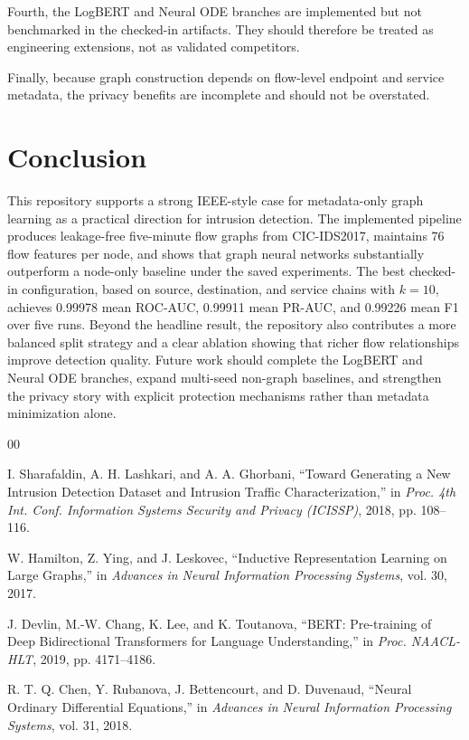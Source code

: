 \documentclass[conference]{IEEEtran}
\begin{document}
Fourth, the LogBERT and Neural ODE branches are implemented but not benchmarked in the checked-in artifacts. They should therefore be treated as engineering extensions, not as validated competitors.

Finally, because graph construction depends on flow-level endpoint and service metadata, the privacy benefits are incomplete and should not be overstated.

\section{Conclusion}
This repository supports a strong IEEE-style case for metadata-only graph learning as a practical direction for intrusion detection. The implemented pipeline produces leakage-free five-minute flow graphs from CIC-IDS2017, maintains 76 flow features per node, and shows that graph neural networks substantially outperform a node-only baseline under the saved experiments. The best checked-in configuration, based on source, destination, and service chains with $k=10$, achieves 0.99978 mean ROC-AUC, 0.99911 mean PR-AUC, and 0.99226 mean F1 over five runs. Beyond the headline result, the repository also contributes a more balanced split strategy and a clear ablation showing that richer flow relationships improve detection quality. Future work should complete the LogBERT and Neural ODE branches, expand multi-seed non-graph baselines, and strengthen the privacy story with explicit protection mechanisms rather than metadata minimization alone.

\begin{thebibliography}{00}

I. Sharafaldin, A. H. Lashkari, and A. A. Ghorbani,
``Toward Generating a New Intrusion Detection Dataset and Intrusion Traffic Characterization,''
in \emph{Proc. 4th Int. Conf. Information Systems Security and Privacy (ICISSP)}, 2018, pp. 108--116.

W. Hamilton, Z. Ying, and J. Leskovec,
``Inductive Representation Learning on Large Graphs,''
in \emph{Advances in Neural Information Processing Systems}, vol. 30, 2017.

J. Devlin, M.-W. Chang, K. Lee, and K. Toutanova,
``BERT: Pre-training of Deep Bidirectional Transformers for Language Understanding,''
in \emph{Proc. NAACL-HLT}, 2019, pp. 4171--4186.

R. T. Q. Chen, Y. Rubanova, J. Bettencourt, and D. Duvenaud,
``Neural Ordinary Differential Equations,''
in \emph{Advances in Neural Information Processing Systems}, vol. 31, 2018.

\end{thebibliography}
\end{document}
